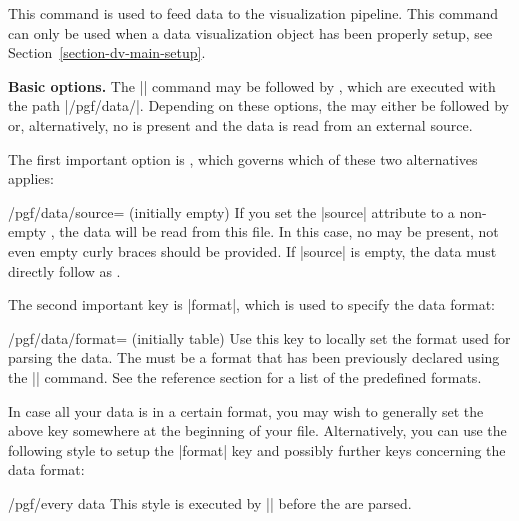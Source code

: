 \begin{command}{\pgfdata{}}
  This command is used to feed data to the visualization
  pipeline. This command can only be used when a data visualization
  object has been properly setup, see
  Section~\ref{section-dv-main-setup}.

  \medskip
  \textbf{Basic options.}
  The |\pgfdata| command may be followed by , which are
  executed with the path |/pgf/data/|. Depending
  on these options, the  may either be followed by
   or, alternatively, no  is
  present and the data is read from an external source.
  
  The first important option is , which governs which of these
  two alternatives applies: 
  \begin{key}{/pgf/data/source= (initially \normalfont empty)}
    If you set the |source| attribute to a non-empty ,
    the data will be read from this file. In this case, no
     may be present, not even empty curly braces
    should be provided. If |source| is empty, the  data must directly
    follow as .
\begin{codeexample}
\pgfdata[format=table,source=file1.csv]
\pgfdata[format=table,source=file2.csv]
\end{codeexample}
\begin{codeexample}
\end{codeexample}
  \end{key}
  The second important key is |format|, which is used to specify the
  data format:
  \begin{key}{/pgf/data/format= (initially table)}
    Use this key to locally set the format used for parsing the
    data. The  must be a format that has been previously
    declared using the |\pgfdeclaredataformat| command. See the
    reference section for a list of the predefined formats.
  \end{key}
  In case all your data is in a certain format, you may wish to
  generally set the above key somewhere at the beginning of your
  file. Alternatively, you can use the following style to setup the
  |format| key and possibly further keys concerning the data format:
  \begin{stylekey}{/pgf/every data}
    This style is executed by |\pgfdata| before the  are
    parsed. 


\end{stylekey}
\end{command}
